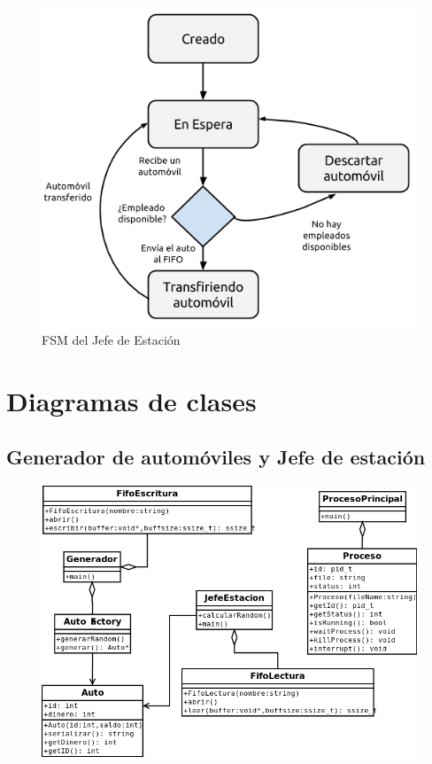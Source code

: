 \documentclass[12pt,a4paper,spanish]{article}
\begin{document}
	\begin{figure}[h]
	\includegraphics[scale=0.75]{FSM_JDE.png}
	\centering
	\caption{FSM del Jefe de Estación}
	\end{figure}

	\newpage
	\section{Diagramas de clases}
	\subsection{Generador de automóviles y Jefe de estación}
	\begin{figure}[h]
	\includegraphics[scale=0.60, angle=90]{GeneradorJde.png}
	\centering
	\end{figure}
\end{document}
